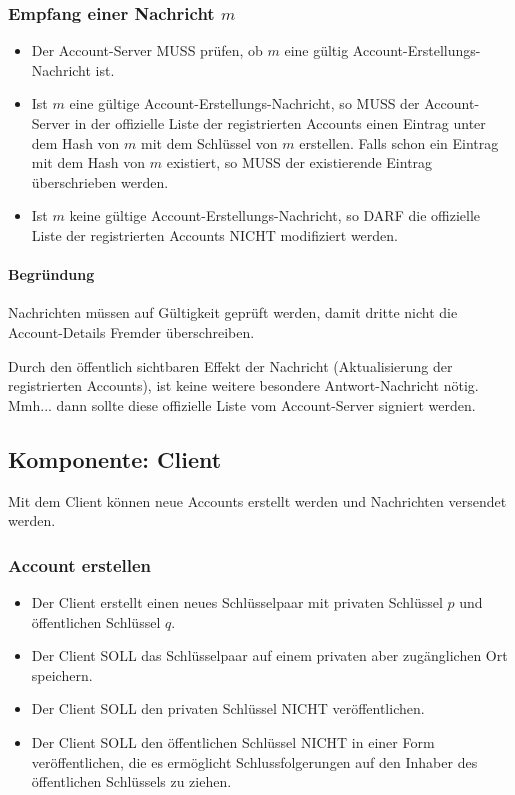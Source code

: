 \documentclass[a4paper,10pt]{article}
\begin{document}
\subsubsection{Empfang einer Nachricht $m$ }
\begin{itemize}
 \item Der Account-Server MUSS prüfen, ob $m$ eine gültig Account-Erstellungs-Nachricht ist.
 \item Ist $m$ eine gültige Account-Erstellungs-Nachricht, so MUSS der Account-Server in der offizielle Liste der registrierten Accounts einen Eintrag unter dem Hash von $m$ mit dem Schlüssel von $m$ erstellen. Falls schon ein Eintrag mit dem Hash von $m$ existiert, so MUSS der existierende Eintrag überschrieben werden.
 \item Ist $m$ keine gültige Account-Erstellungs-Nachricht, so DARF die offizielle Liste der registrierten Accounts NICHT modifiziert werden.
\end{itemize}

\paragraph{Begründung}
Nachrichten müssen auf Gültigkeit geprüft werden, damit dritte nicht die Account-Details Fremder überschreiben.

Durch den öffentlich sichtbaren Effekt der Nachricht (Aktualisierung der registrierten Accounts), ist keine weitere besondere Antwort-Nachricht nötig. Mmh... dann sollte diese offizielle Liste vom Account-Server signiert werden.


\subsection{Komponente: Client}
Mit dem Client können neue Accounts erstellt werden und Nachrichten versendet werden.
\subsubsection{Account erstellen}
\begin{itemize}
 \item Der Client erstellt einen neues Schlüsselpaar mit privaten Schlüssel $p$ und öffentlichen Schlüssel $q$.
 \item Der Client SOLL das Schlüsselpaar auf einem privaten aber zugänglichen Ort speichern.
 \item Der Client SOLL den privaten Schlüssel NICHT veröffentlichen.
 \item Der Client SOLL den öffentlichen Schlüssel NICHT in einer Form veröffentlichen, die es ermöglicht Schlussfolgerungen auf den Inhaber des öffentlichen Schlüssels zu ziehen.
\end{itemize}
\end{document}
